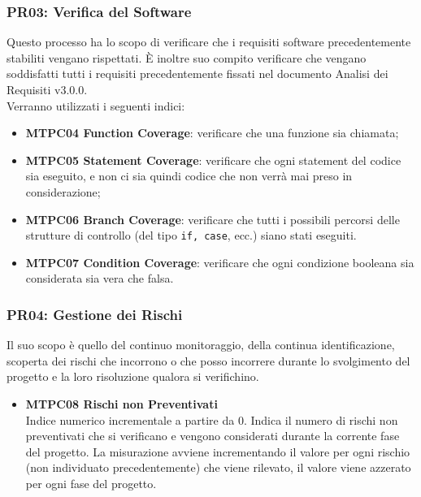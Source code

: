 \subsubsection{PR03: Verifica del Software}
Questo processo ha lo scopo di verificare che i requisiti software precedentemente stabiliti vengano rispettati. È inoltre suo compito verificare che vengano soddisfatti
tutti i requisiti precedentemente fissati nel documento Analisi dei Requisiti v3.0.0. \-\\ Verranno utilizzati i seguenti indici:

\begin{itemize}
	\item \textbf{MTPC04 Function Coverage}: verificare che una funzione sia chiamata;
	\item \textbf{MTPC05 Statement Coverage}: verificare che ogni statement del codice sia eseguito, e non ci sia quindi codice che non verrà mai preso in considerazione;
	\item \textbf{MTPC06 Branch Coverage}: verificare che tutti i possibili percorsi delle strutture di controllo (del tipo \texttt{if, case}, ecc.) siano stati eseguiti.
	\item \textbf{MTPC07 Condition Coverage}: verificare che ogni condizione booleana sia considerata sia vera che falsa.
\end{itemize}

\subsubsection{PR04: Gestione dei Rischi}
Il suo scopo è quello del continuo monitoraggio, della continua identificazione, scoperta dei rischi che incorrono o che posso incorrere durante lo svolgimento del progetto e la loro risoluzione qualora si verifichino.
\begin{itemize}

\item \textbf{MTPC08 Rischi non Preventivati}\-\\
Indice numerico incrementale a partire da 0. Indica il numero di rischi non preventivati che si verificano e vengono considerati durante la corrente fase del progetto. La misurazione avviene incrementando il valore per ogni rischio (non individuato precedentemente) che viene rilevato, il valore viene azzerato per ogni fase del progetto.

\end{itemize}

